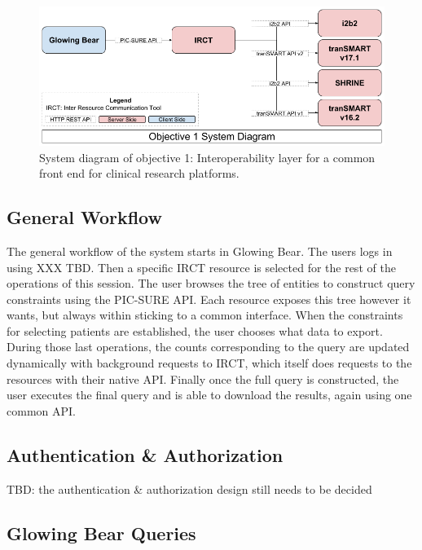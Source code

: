\begin{figure}[h!]
    \centering
    \includegraphics[width=1\textwidth]{figures/sys_diagram_obj1.png}
    \caption{System diagram of objective 1: Interoperability layer for a common front end for clinical research platforms.}
    \label{fig:sysdiagramobj1}
\end{figure}

\subsection{General Workflow}

The general workflow of the system starts in Glowing Bear.
The users logs in using XXX TBD.
Then a specific IRCT resource is selected for the rest of the operations of this session.
The user browses the tree of entities to construct query constraints using the PIC-SURE API.
Each resource exposes this tree however it wants, but always within sticking to a common interface.
When the constraints for selecting patients are established, the user chooses what data to export.
During those last operations, the counts corresponding to the query are updated dynamically with background requests to IRCT, which itself does requests to the resources with their native API.
Finally once the full query is constructed, the user executes the final query and is able to download the results, again using one common API.


\subsection{Authentication \& Authorization}
TBD: the authentication \& authorization design still needs to be decided



\subsection{Glowing Bear Queries}

